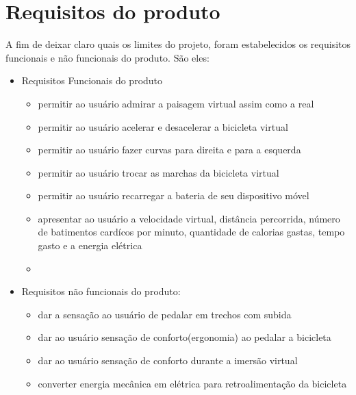 \chapter[Requisitos do produto]{Requisitos do produto}

A fim de deixar claro quais os limites do projeto, foram estabelecidos os requisitos funcionais e não funcionais do produto. São eles:
\begin{itemize}
	\item Requisitos Funcionais do produto
		\begin{itemize}
		\item permitir ao usuário admirar a paisagem virtual assim como a real
		\item permitir ao usuário acelerar e desacelerar a bicicleta virtual
		\item permitir ao usuário fazer curvas para direita e para a esquerda
		\item permitir ao usuário trocar as marchas da bicicleta virtual
		\item permitir ao usuário recarregar a bateria de seu dispositivo móvel
		\item apresentar ao usuário a velocidade virtual, distância percorrida, número de batimentos cardícos por minuto, quantidade de calorias gastas, tempo gasto e a energia elétrica
		\item 
		\end{itemize}
	\item Requisitos não funcionais do produto:
		\begin{itemize}
		\item dar a sensação ao usuário de pedalar em trechos com subida
		\item dar ao usuário sensação de conforto(ergonomia) ao pedalar a bicicleta
		\item dar ao usuário sensação de conforto durante a imersão virtual
		\item converter energia mecânica em elétrica para retroalimentação da bicicleta
		\end{itemize}
\end{itemize}
